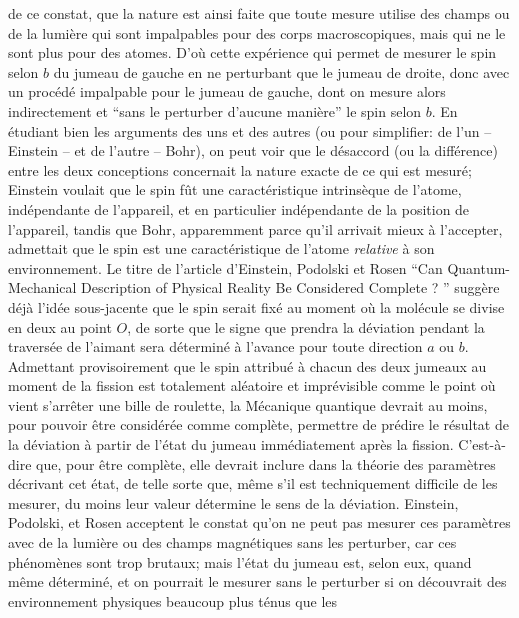 de ce constat, que la nature est ainsi faite que toute mesure utilise des 
champs ou de la lumi\`ere qui sont impalpables pour des corps 
macroscopiques, mais qui ne le sont plus pour des atomes. D'o\`u cette 
exp\'erience qui permet de mesurer le spin selon $b$ du jumeau de  
gauche en ne perturbant que le jumeau de droite, donc avec un proc\'ed\'e
impalpable pour le jumeau de gauche, dont on mesure alors indirectement et
``sans le perturber d'aucune mani\`ere'' le spin selon $b$.  
\medskip 
En \'etudiant bien les arguments des uns et des autres (ou pour  
simplifier:  de l'un -- Einstein --  et de l'autre -- Bohr), on peut voir que 
le d\'esaccord (ou la diff\'erence) entre les deux conceptions concernait 
la nature exacte de ce qui est mesur\'e; Einstein voulait que le spin f\^ut  
une caract\'eristique intrins\`eque de l'atome, ind\'ependante de  
l'appareil, et en particulier ind\'ependante de la position de l'appareil, 
tandis que Bohr, apparemment parce qu'il arrivait mieux \`a l'accepter, 
admettait que le spin est une caract\'eristique de l'atome {\it relative} 
\`a son environnement. Le titre de l'article d'Einstein, Podolski et Rosen 
``Can Quantum-Mechanical Description of Physical Reality Be Considered 
Complete ? '' sugg\`ere d\'ej\`a l'id\'ee sous-jacente que le spin serait 
fix\'e au moment o\`u la mol\'ecule se divise en deux au point $O$, de 
sorte que le signe que prendra la d\'eviation pendant la travers\'ee de 
l'aimant sera d\'etermin\'e \`a l'avance pour toute direction $a$ ou $b$. 
Admettant provisoirement que le spin attribu\'e \`a chacun des deux 
jumeaux au moment de la fission est totalement al\'eatoire et 
impr\'evisible comme le point o\`u vient s'arr\^eter une bille de roulette, 
la M\'ecanique quantique devrait au moins, pour pouvoir \^etre 
consid\'er\'ee  comme compl\`ete, per\-met\-tre de pr\'edire le  
r\'esultat de la  d\'eviation \`a partir de l'\'etat du jumeau 
imm\'ediatement  apr\`es la fission. C'est-\`a-dire que, pour \^etre 
compl\`ete, elle devrait inclure dans la th\'eorie des param\`etres 
d\'ecrivant cet \'etat, de telle sorte que, m\^eme s'il est techniquement 
difficile de les mesurer, du moins leur valeur d\'etermine le sens de la 
d\'eviation. Einstein, Podolski, et Rosen acceptent le constat qu'on ne 
peut pas mesurer ces param\`etres  avec de la  lumi\`ere ou des champs 
magn\'etiques sans  les perturber,  car ces ph\'enom\`enes sont trop 
brutaux; mais l'\'etat du jumeau est, selon eux, quand m\^eme 
d\'etermin\'e, et on pourrait le mesurer sans le perturber si on 
d\'ecouvrait des environnement physiques beaucoup plus t\'enus que les 
